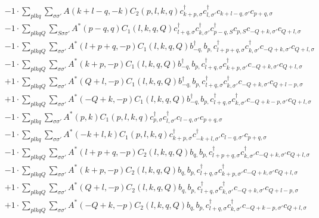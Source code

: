\begin{align*}
	&-1 \cdot \sum_{ p l k q } \sum_{ \sigma \sigma' } A( k+l-q, -k )  C_2( p, l, k, q )   c_{ k+p, \sigma }^\dagger  c_{ l, \sigma' }^\dagger  c_{ k+l-q, \sigma' } c_{ p+q, \sigma }  \\
	&-1 \cdot \sum_{ p l k q Q } \sum_{ S \sigma \sigma' } A^*( p-q, q )  C_1( l, k, q, Q )   c_{ l+q, \sigma }^\dagger  c_{ k, \sigma' }^\dagger  c_{ p-q, S }^\dagger  c_{ p, S } c_{ -Q+k, \sigma' } c_{ Q+l, \sigma }  \\
	&-1 \cdot \sum_{ p l k q Q } \sum_{ \sigma \sigma' } A^*( l+p+q, -p )  C_1( l, k, q, Q )   b_{ -q, }^\dagger  b_{ p, } c_{ l+p+q, \sigma }^\dagger  c_{ k, \sigma' }^\dagger  c_{ -Q+k, \sigma' } c_{ Q+l, \sigma }  \\
	&-1 \cdot \sum_{ p l k q Q } \sum_{ \sigma \sigma' } A^*( k+p, -p )  C_1( l, k, q, Q )   b_{ -q, }^\dagger  b_{ p, } c_{ l+q, \sigma }^\dagger  c_{ k+p, \sigma' }^\dagger  c_{ -Q+k, \sigma' } c_{ Q+l, \sigma }  \\
	&+1 \cdot \sum_{ p l k q Q } \sum_{ \sigma \sigma' } A^*( Q+l, -p )  C_1( l, k, q, Q )   b_{ -q, }^\dagger  b_{ p, } c_{ l+q, \sigma }^\dagger  c_{ k, \sigma' }^\dagger  c_{ -Q+k, \sigma' } c_{ Q+l-p, \sigma }  \\
	&+1 \cdot \sum_{ p l k q Q } \sum_{ \sigma \sigma' } A^*( -Q+k, -p )  C_1( l, k, q, Q )   b_{ -q, }^\dagger  b_{ p, } c_{ l+q, \sigma }^\dagger  c_{ k, \sigma' }^\dagger  c_{ -Q+k-p, \sigma' } c_{ Q+l, \sigma }  \\
	&-1 \cdot \sum_{ p l k q } \sum_{ \sigma \sigma' } A^*( p, k )  C_1( p, l, k, q )   c_{ p, \sigma }^\dagger  c_{ l, \sigma' }^\dagger  c_{ l-q, \sigma' } c_{ p+q, \sigma }  \\
	&-1 \cdot \sum_{ p l k q } \sum_{ \sigma \sigma' } A^*( -k+l, k )  C_1( p, l, k, q )   c_{ k+p, \sigma }^\dagger  c_{ -k+l, \sigma' }^\dagger  c_{ l-q, \sigma' } c_{ p+q, \sigma }  \\
	&-1 \cdot \sum_{ p l k q Q } \sum_{ \sigma \sigma' } A^*( l+p+q, -p )  C_2( l, k, q, Q )   b_{ q, } b_{ p, } c_{ l+p+q, \sigma }^\dagger  c_{ k, \sigma' }^\dagger  c_{ -Q+k, \sigma' } c_{ Q+l, \sigma }  \\
	&-1 \cdot \sum_{ p l k q Q } \sum_{ \sigma \sigma' } A^*( k+p, -p )  C_2( l, k, q, Q )   b_{ q, } b_{ p, } c_{ l+q, \sigma }^\dagger  c_{ k+p, \sigma' }^\dagger  c_{ -Q+k, \sigma' } c_{ Q+l, \sigma }  \\
	&+1 \cdot \sum_{ p l k q Q } \sum_{ \sigma \sigma' } A^*( Q+l, -p )  C_2( l, k, q, Q )   b_{ q, } b_{ p, } c_{ l+q, \sigma }^\dagger  c_{ k, \sigma' }^\dagger  c_{ -Q+k, \sigma' } c_{ Q+l-p, \sigma }  \\
	&+1 \cdot \sum_{ p l k q Q } \sum_{ \sigma \sigma' } A^*( -Q+k, -p )  C_2( l, k, q, Q )   b_{ q, } b_{ p, } c_{ l+q, \sigma }^\dagger  c_{ k, \sigma' }^\dagger  c_{ -Q+k-p, \sigma' } c_{ Q+l, \sigma } 
\end{align*}
